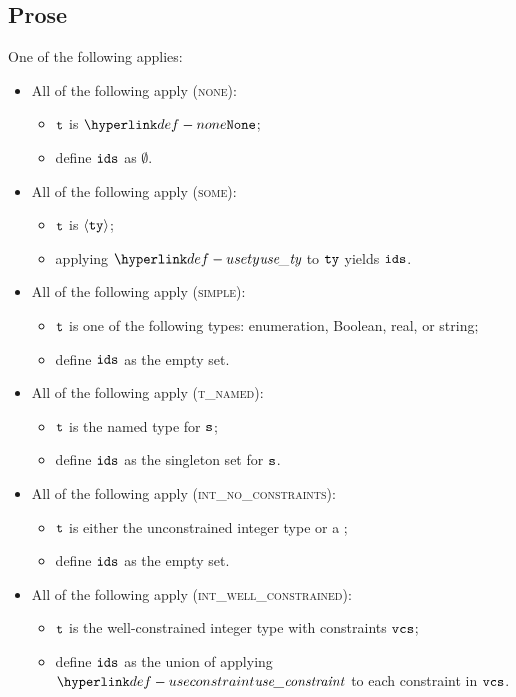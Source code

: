 \subsection{Prose}
One of the following applies:
\begin{itemize}
  \item All of the following apply (\textsc{none}):
  \begin{itemize}
    \item $\texttt{t}$ is $\None$;
    \item define $\texttt{ids}$ as $\emptyset$.
  \end{itemize}

  \item All of the following apply (\textsc{some}):
  \begin{itemize}
    \item $\texttt{t}$ is $\langle\texttt{ty}\rangle$;
    \item applying $\usety$ to $\texttt{ty}$ yields $\texttt{ids}$.
  \end{itemize}

  \item All of the following apply (\textsc{simple}):
  \begin{itemize}
    \item $\texttt{t}$ is one of the following types: enumeration, Boolean, real, or string;
    \item define $\texttt{ids}$ as the empty set.
  \end{itemize}

  \item All of the following apply (\textsc{t\_named}):
  \begin{itemize}
    \item $\texttt{t}$ is the named type for $\texttt{s}$;
    \item define $\texttt{ids}$ as the singleton set for $\texttt{s}$.
  \end{itemize}

  \item All of the following apply (\textsc{int\_no\_constraints}):
  \begin{itemize}
    \item $\texttt{t}$ is either the unconstrained integer type or a \parameterizedintegertype;
    \item define $\texttt{ids}$ as the empty set.
  \end{itemize}

  \item All of the following apply (\textsc{int\_well\_constrained}):
  \begin{itemize}
    \item $\texttt{t}$ is the well-constrained integer type with constraints $\texttt{vcs}$;
    \item define $\texttt{ids}$ as the union of applying $\useconstraint$ to each constraint in $\texttt{vcs}$.
  \end{itemize}


\end{itemize}
